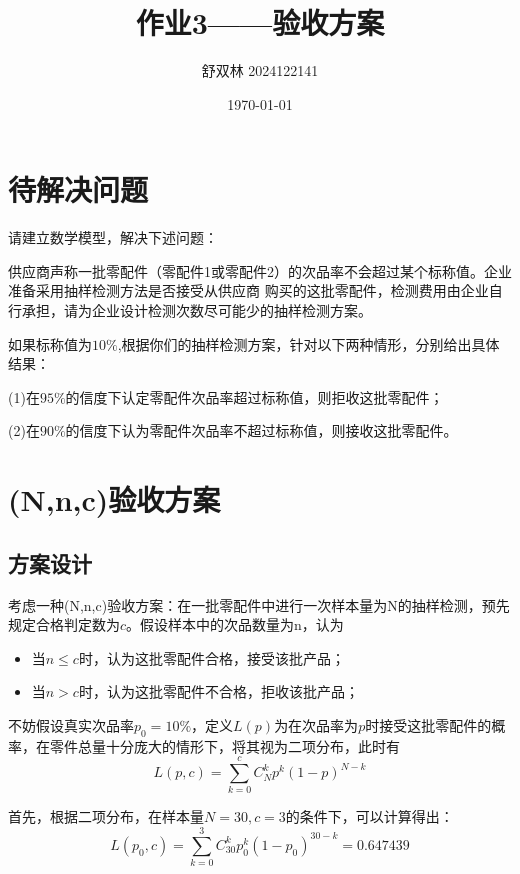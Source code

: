 \documentclass[a4paper,12pt]{ctexart} %
\title{作业3——验收方案}
\author{舒双林 2024122141}
\date{\today}
\begin{document}
	
\maketitle
\setcounter{page}{1}
	

\section{待解决问题}
请建立数学模型，解决下述问题：

供应商声称一批零配件（零配件1或零配件2）的次品率不会超过某个标称值。企业准备采用抽样检测方法是否接受从供应商
购买的这批零配件，检测费用由企业自行承担，请为企业设计检测次数尽可能少的抽样检测方案。

如果标称值为$10\%$,根据你们的抽样检测方案，针对以下两种情形，分别给出具体结果：

(1)在$95\%$的信度下认定零配件次品率超过标称值，则拒收这批零配件；

(2)在$90\%$的信度下认为零配件次品率不超过标称值，则接收这批零配件。

\section{(N,n,c)验收方案}
\subsection{方案设计}

考虑一种(N,n,c)验收方案：在一批零配件中进行一次样本量为N的抽样检测，预先规定合格判定数为$c$。假设样本中的次品数量为n，认为
\begin{itemize}
	\item 当$n \leqslant c$时，认为这批零配件合格，接受该批产品；
	\item 当$n > c$时，认为这批零配件不合格，拒收该批产品；
\end{itemize}

不妨假设真实次品率$p_0 = 10\%$，定义$L(p)$为在次品率为$p$时接受这批零配件的概率，在零件总量十分庞大的情形下，将其视为二项分布，此时有
\begin{equation}
	L\left( p,c \right) =\sum_{k=0}^c{C_{N}^{k} p^k\left( 1-p \right) ^{N-k}}
\end{equation}

首先，根据二项分布，在样本量$N=30,c=3$的条件下，可以计算得出：
\begin{equation}
	L(p_0 ,c) =\sum_{k=0}^3{C_{30}^{k} p_0^k\left( 1-p_0 \right) ^{30-k}}=0.647439
\end{equation}
\end{document}
